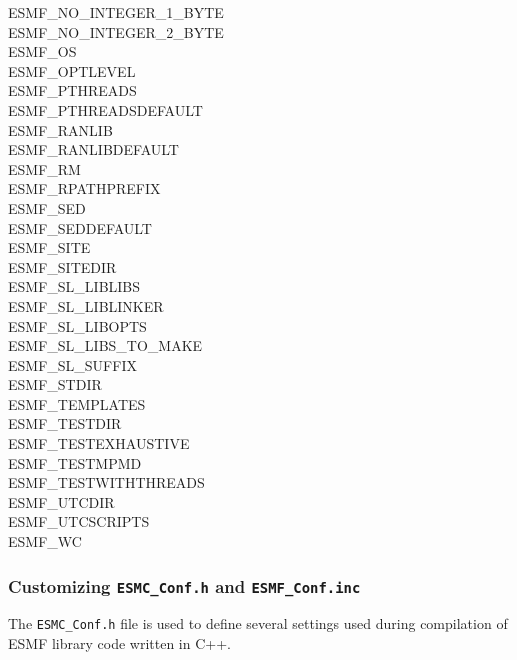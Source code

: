 \begin{description}
\item[ESMF\_NO\_INTEGER\_1\_BYTE]
\item[ESMF\_NO\_INTEGER\_2\_BYTE]
\item[ESMF\_OS]
\item[ESMF\_OPTLEVEL]
\item[ESMF\_PTHREADS]
\item[ESMF\_PTHREADSDEFAULT]
\item[ESMF\_RANLIB]
\item[ESMF\_RANLIBDEFAULT]
\item[ESMF\_RM]
\item[ESMF\_RPATHPREFIX]
\item[ESMF\_SED]
\item[ESMF\_SEDDEFAULT]
\item[ESMF\_SITE]
\item[ESMF\_SITEDIR]
\item[ESMF\_SL\_LIBLIBS]
\item[ESMF\_SL\_LIBLINKER]
\item[ESMF\_SL\_LIBOPTS]
\item[ESMF\_SL\_LIBS\_TO\_MAKE]
\item[ESMF\_SL\_SUFFIX]
\item[ESMF\_STDIR]
\item[ESMF\_TEMPLATES]
\item[ESMF\_TESTDIR]
\item[ESMF\_TESTEXHAUSTIVE]
\item[ESMF\_TESTMPMD]
\item[ESMF\_TESTWITHTHREADS]
\item[ESMF\_UTCDIR]
\item[ESMF\_UTCSCRIPTS]
\item[ESMF\_WC]

\end{description}



\subsubsection{Customizing {\tt ESMC\_Conf.h} and {\tt ESMF\_Conf.inc}}

The {\tt ESMC\_Conf.h} file is used to define several settings used
during compilation of ESMF library code written in C++.

